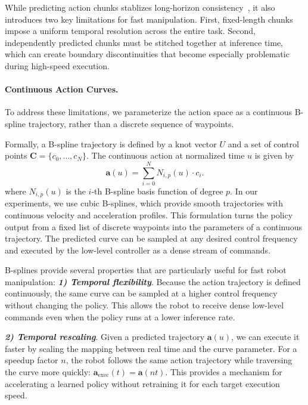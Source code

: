 While predicting action chunks stablizes long-horizon consistency~\cite{dp, block2023provbc, zhang2025actionchunkingexploratorydata}, it also introduces two key limitations for fast manipulation. First, fixed-length chunks impose a uniform temporal resolution across the entire task. Second, independently predicted chunks must be stitched together at inference time, which can create boundary discontinuities that become especially problematic during high-speed execution.

\paragraph{Continuous Action Curves.} To address these limitations, we parameterize the action space as a continuous B-spline trajectory, rather than a discrete sequence of waypoints.


Formally, a B-spline trajectory is defined by a knot vector $U$ and a set of control points $\mathbf{C} = \{c_0, \ldots, c_N\}$. The continuous action at normalized time $u$ is given by
\begin{equation}
    \mathbf{a}(u) = \sum_{i=0}^{N} N_{i,p}(u) \cdot c_i .
\end{equation}
where $N_{i,p}(u)$ is the $i$-th B-spline basis function of degree $p$. In our experiments, we use cubic B-splines, which provide smooth trajectories with continuous velocity and acceleration profiles. This formulation turns the policy output from a fixed list of discrete waypoints into the parameters of a continuous trajectory. The predicted curve can be sampled at any desired control frequency and executed by the low-level controller as a dense stream of commands.


B-splines provide several properties that are particularly useful for fast robot manipulation:
\newline
\textbf{\textit{1) Temporal flexibility}}. Because the action trajectory is defined continuously, the same curve can be sampled at a higher control frequency without changing the policy. This allows the robot to receive dense low-level commands even when the policy runs at a lower inference rate.

\textbf{\textit{2) Temporal rescaling}}. Given a predicted trajectory $\mathbf{a}(u)$, we can execute it faster by scaling the mapping between real time and the curve parameter. For a speedup factor $n$, the robot follows the same action trajectory while traversing the curve more quickly:
$\mathbf{a}_{\mathrm{exec}}(t) = \mathbf{a}(n t)$.
This provides a mechanism for accelerating a learned policy without retraining it for each target execution speed.

